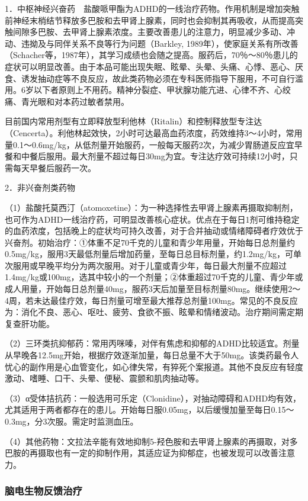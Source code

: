 1．中枢神经兴奋药　盐酸哌甲酯为ADHD的一线治疗药物。作用机制是增加突触前神经末梢结节释放多巴胺和去甲肾上腺素，同时也会抑制其再吸收，从而提高突触间隙多巴胺、去甲肾上腺素浓度。主要改善患儿的注意力，明显减少多动、冲动、违拗及与同伴关系不良等行为问题（Barkley,
1989年），使家庭关系有所改善（Schacher等，1987年），其学习成绩也会随之提高。服药后，70％～80％患儿的症状可以明显改善。由于本品可能出现失眠、眩晕、头晕、头痛、心悸、恶心、厌食、诱发抽动症等不良反应，故此类药物必须在专科医师指导下服用，不可自行滥用。6岁以下者原则上不用药。精神分裂症、甲状腺功能亢进、心律不齐、心绞痛、青光眼和对本药过敏者禁用。

目前国内常用剂型有立即释放型利他林（Ritalin）和控制释放型专注达（Cencerta）。利他林起效快，2小时可达最高血药浓度，药效维持3～4小时，常用量0.1～0.6mg/kg，从低剂量开始服药，一般每天服药2次，为减少胃肠道反应宜早餐和中餐后服用。最大剂量不超过每日30mg为宜。专注达疗效可持续12小时，只需每天早餐后服药一次。

2．非兴奋剂类药物

（1）盐酸托莫西汀（atomoxetine）：为一种选择性去甲肾上腺素再摄取抑制剂，也可作为ADHD一线治疗药，可明显改善核心症状。优点在于每日1剂可维持稳定的血药浓度，包括晚上的症状均可持久改善，对于合并抽动或情绪障碍者疗效优于兴奋剂。初始治疗：①体重不足70千克的儿童和青少年用量，开始每日总剂量约0.5mg/kg，服用3天最低剂量后增加药量，至每日总目标剂量，约1.2mg/kg，可单次服用或早晚平均分为两次服用。对于儿童或青少年，每日最大剂量不应超过1.4mg/kg或100mg，选其中较小的一个剂量；②体重超过70千克的儿童、青少年或成人用量，开始每日总剂量40mg，服药3天后加量至目标剂量80mg。继续使用2～4周，若未达最佳疗效，每日剂量可增至最大推荐总剂量100mg。常见的不良反应为：消化不良、恶心、呕吐、疲劳、食欲不振、眩晕和情绪波动。治疗期间需定期复查肝功能。

（2）三环类抗抑郁药：常用丙咪嗪，对伴有焦虑和抑郁的ADHD比较适宜。剂量从早晚各12.5mg开始，根据疗效逐渐加量，每日总量不大于50mg。该类药最令人忧心的副作用是心血管变化，如心律失常，有猝死个案报道。其他不良反应有轻度激动、嗜睡、口干、头晕、便秘、震颤和肌肉抽动等。

（3）α受体拮抗药：一般选用可乐定（Clonidine），对抽动障碍和ADHD均有效，尤其适用于两者都存在的患儿。开始每日服0.05mg，以后缓慢加量至每日0.15～0.3mg，分3次服。需定时监测血压。

（4）其他药物：文拉法辛能有效地抑制5-羟色胺和去甲肾上腺素的再摄取，对多巴胺的再摄取也有一定的抑制作用，其适应证为抑郁症，也被发现可以改善注意力。

\subsubsection{脑电生物反馈治疗}

